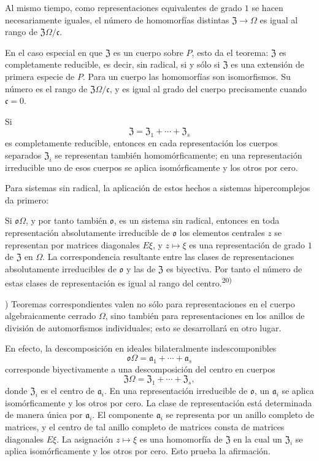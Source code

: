\documentclass[11pt]{article}
\providecommand{\mo}{\mathfrak{o}}
\providecommand{\ma}{\mathfrak{a}}
\providecommand{\mc}{\mathfrak{c}}
\providecommand{\mZ}{\mathfrak{Z}}
\begin{document}
Al mismo tiempo, como representaciones equivalentes de grado $1$ se hacen necesariamente iguales, el número de homomorfías distintas $\mZ\to\Omega$ es igual al rango de $\mZ\Omega/\mc$.

En el caso especial en que $\mZ$ es un cuerpo sobre $P$, esto da el teorema: $\mZ$ es completamente reducible, es decir, sin radical, si y sólo si $\mZ$ es una extensión de primera especie de $P$. Para un cuerpo las homomorfías son isomorfismos. Su número es el rango de $\mZ\Omega/\mc$, y es igual al grado del cuerpo precisamente cuando $\mc=0$.

Si
\[
        \mZ=\mZ_1+\cdots+\mZ_s
\]
es completamente reducible, entonces en cada representación los cuerpos separados $\mZ_i$ se representan también homomórficamente; en una representación irreducible uno de esos cuerpos se aplica isomórficamente y los otros por cero.

Para sistemas sin radical, la aplicación de estos hechos a sistemas hipercomplejos da primero:

Si $\mo\Omega$, y por tanto también $\mo$, es un sistema sin radical, entonces en toda representación absolutamente irreducible de $\mo$ los elementos centrales $z$ se representan por matrices diagonales $E\xi$, y $z\mapsto \xi$ es una representación de grado $1$ de $\mZ$ en $\Omega$. La correspondencia resultante entre las clases de representaciones absolutamente irreducibles de $\mo$ y las de $\mZ$ es biyectiva. Por tanto el número de estas clases de representación es igual al rango del centro.\textsuperscript{20)}

{\footnotesize{}) Teoremas correspondientes valen no sólo para representaciones en el cuerpo algebraicamente cerrado $\Omega$, sino también para representaciones en los anillos de división de automorfismos individuales; esto se desarrollará en otro lugar.\par}

En efecto, la descomposición en ideales bilateralmente indescomponibles
\[
        \mo\Omega=\ma_1+\cdots+\ma_s
\]
corresponde biyectivamente a una descomposición del centro en cuerpos
\[
        \mZ\Omega=\mZ_1+\cdots+\mZ_s,
\]
donde $\mZ_i$ es el centro de $\ma_i$. En una representación irreducible de $\mo$, un $\ma_i$ se aplica isomórficamente y los otros por cero. La clase de representación está determinada de manera única por $\ma_i$. El componente $\ma_i$ se representa por un anillo completo de matrices, y el centro de tal anillo completo de matrices consta de matrices diagonales $E\xi$. La asignación $z\mapsto \xi$ es una homomorfía de $\mZ$ en la cual un $\mZ_i$ se aplica isomórficamente y los otros por cero. Esto prueba la afirmación.
\end{document}
